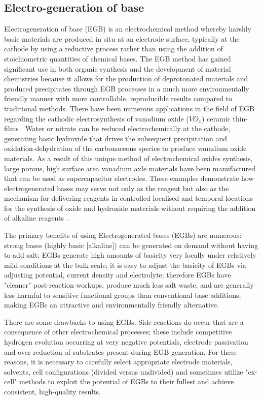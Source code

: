 \documentclass[12pt,a4paper]{report}
\begin{document}
	\subsection{Electro-generation of base}
	Electrogeneration of base (EGB) is an electrochemical method whereby harshly basic materials are produced in situ at an electrode surface, typically at the cathode by using a reductive process rather than using the addition of stoichiometric quantities of chemical bases. The EGB method has gained significant use in both organic synthesis and the development of material chemistries because it allows for the production of deprotonated materials and produced precipitates through EGB processes in a much more environmentally friendly manner with more controllable, reproducible results compared to traditional methods. There have been numerous applications in the field of EGB regarding the cathodic electrosynthesis of vanadium oxide ($VO_x$) ceramic thin-films \cite{cite1}. Water or nitrate can be reduced electrochemically at the cathode, generating basic hydroxide that drives the subsequent precipitation and oxidation-dehydration of the carbonaceous species to produce vanadium oxide materials. As a result of this unique method of electrochemical oxides synthesis, large porous, high surface area vanadium axle materials have been manufactured that can be used as supercapacitor electrodes. These examples demonstrate how electrogenerated bases may serve not only as the reagent but also as the mechanism for delivering reagents in controlled localised and temporal locations for the synthesis of oxide and hydroxide materials without requiring the addition of alkaline reagents \cite{cite2}.
	
	The primary benefits of using Electrogenerated bases (EGBs) are numerous: strong bases (highly basic [alkaline]) can be generated on demand without having to add salt; EGBs generate high amounts of basicity very locally under relatively mild conditions at the bulk scale; it is easy to adjust the basicity of EGBs via adjusting potential, current density and electrolyte; therefore EGBs have "cleaner" post-reaction workups, produce much less salt waste, and are generally less harmful to sensitive functional groups than conventional base additions, making EGBs an attractive and environmentally friendly alternative.
	
	There are some drawbacks to using EGBs. Side reactions do occur that are a consequence of other electrochemical processes; these include competitive hydrogen evolution occurring at very negative potentials, electrode passivation and over-reduction of substrates present during EGB generation. \cite{cite3} For these reasons, it is necessary to carefully select appropriate electrode materials, solvents, cell configurations (divided versus undivided) and sometimes utilize "ex-cell" methods to exploit the potential of EGBs to their fullest and achieve consistent, high-quality results.
	
\end{document}
